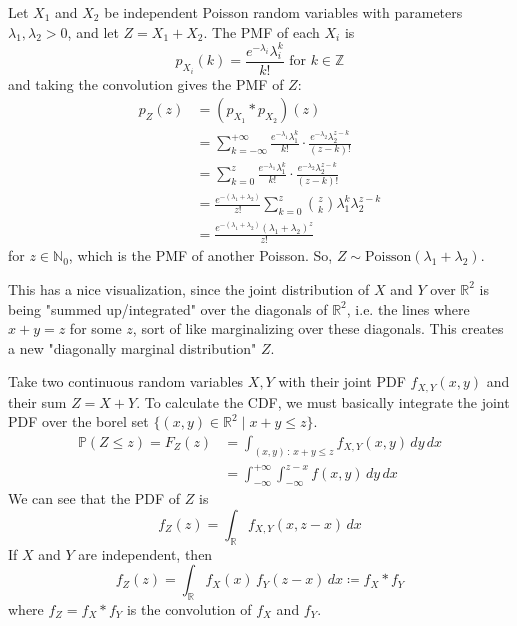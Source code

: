     \begin{example}
      Let $X_1$ and $X_2$ be independent Poisson random variables with parameters $\lambda_1, \lambda_2 > 0$, and let $Z = X_1 + X_2$. The PMF of each $X_i$ is 
      \begin{equation}
        p_{X_i} (k) = \frac{e^{-\lambda_i} \lambda_i^k}{k!} \text{ for } k \in \mathbb{Z}
      \end{equation}
      and taking the convolution gives the PMF of $Z$: 
      \begin{align*}
        p_Z (z) & = (p_{X_1} \ast p_{X_2}) (z) \\
        & = \sum_{k=-\infty}^{+\infty} \frac{e^{-\lambda_1} \lambda_1^k}{k!} \cdot \frac{e^{-\lambda_2} \lambda_2^{z - k}}{(z - k)!} \\
        & = \sum_{k=0}^{z} \frac{e^{-\lambda_1} \lambda_1^k}{k!} \cdot \frac{e^{-\lambda_2} \lambda_2^{z - k}}{(z - k)!} \\ 
        & = \frac{e^{-(\lambda_1 + \lambda_2)}}{z!} \sum_{k=0}^z \binom{z}{k} \lambda_1^k \lambda_2^{z - k} \\
        & = \frac{e^{-(\lambda_1 + \lambda_2)} (\lambda_1 + \lambda_2)^z}{z!} 
      \end{align*}
      for $z \in \mathbb{N}_0$, which is the PMF of another Poisson. So, $Z \sim \mathrm{Poisson}(\lambda_1 + \lambda_2)$. 
    \end{example}

    This has a nice visualization, since the joint distribution of $X$ and $Y$ over $\mathbb{R}^2$ is being "summed up/integrated" over the diagonals of $\mathbb{R}^2$, i.e. the lines where $x + y = z$ for some $z$, sort of like marginalizing over these diagonals. This creates a new "diagonally marginal distribution" $Z$. 

    \begin{definition}
      Take two continuous random variables $X, Y$ with their joint PDF $f_{X, Y} (x, y)$ and their sum $Z = X + Y$. To calculate the CDF, we must basically integrate the joint PDF over the borel set $\{(x, y) \in \mathbb{R}^2 \mid x + y \leq z\}$. 
      \begin{align*}
        \mathbb{P}(Z \leq z) = F_Z (z) & = \int_{(x, y) \,:\, x + y \leq z} f_{X, Y} (x, y) \,dy\,dx \\
        & = \int_{-\infty}^{+\infty} \int_{-\infty}^{z - x} f(x, y) \,dy \,dx
      \end{align*}
      We can see that the PDF of $Z$ is 
      \begin{equation}
        f_{Z} (z) = \int_{\mathbb{R}} f_{X, Y} (x, z - x) \, dx
      \end{equation}
      If $X$ and $Y$ are independent, then 
      \begin{equation}
        f_{Z} (z) = \int_{\mathbb{R}} f_{X} (x) \, f_Y (z - x) \,dx \coloneqq f_X \ast f_Y
      \end{equation}
      where $f_Z = f_X \ast f_Y$ is the convolution of $f_X$ and $f_Y$. 
    \end{definition}

